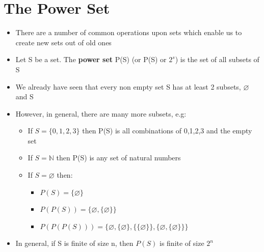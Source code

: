 \documentclass{article}[18pt]
\begin{document}
\section{The Power Set}
\begin{itemize}
	\item There are a number of common operations upon sets which enable us to create new sets out of old ones
	\item Let S be a set. The \textbf{power set} P(S) (or P(S) or $2^s$) is the set of all subsets of S
	\item We already have seen that every non empty set S has at least 2 subsets, $\varnothing$ and S
	\item However, in general, there are many more subsets, e.g:
	\begin{itemize}
		\item If $S=\{0,1,2,3\}$ then P(S) is all combinations of 0,1,2,3 and the empty set
		\item If $S=\mathbb{N}$ then P(S) is any set of natural numbers
		\item If $S=\varnothing$ then:
		\begin{itemize}
			\item $P(S)=\{\varnothing\}$
			\item $P(P(S))=\{\varnothing,\{\varnothing\}\}$
			\item $P(P(P(S)))=\{ \varnothing , \{ \varnothing \} , \{ \{ \varnothing \} \} , \{ \varnothing , \{ \varnothing \} \} \}$
		\end{itemize}
	\end{itemize}
	\item In general, if S is finite of size n, then $P(S)$ is finite of size $2^n$
\end{itemize}
\end{document}
